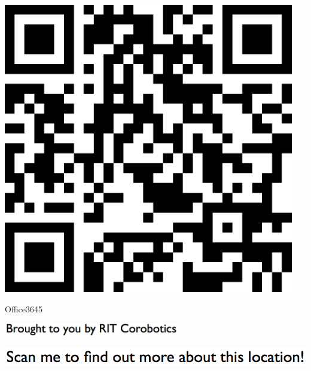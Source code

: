 \documentclass[letterpaper]{article}
\begin{document}
 \begingroup 
 \centerline{\includegraphics[scale=1,width=5in,height=5in]{Office3645.png}} 
 \endgroup 
 \vspace*{\fill} 

 \hfill{\small Office3645} 

  \vspace{0.7in} 
 
 \centerline{\includegraphics[scale=1,width=3in]{text-bottom.png}} 
 
 \pagebreak 
{} 
 \vspace*{\fill} 
 
  \centerline{\includegraphics[scale=1,width=6in]{text-top.png}} 
 
 \vspace{0.5in} 
 
\end{document}
